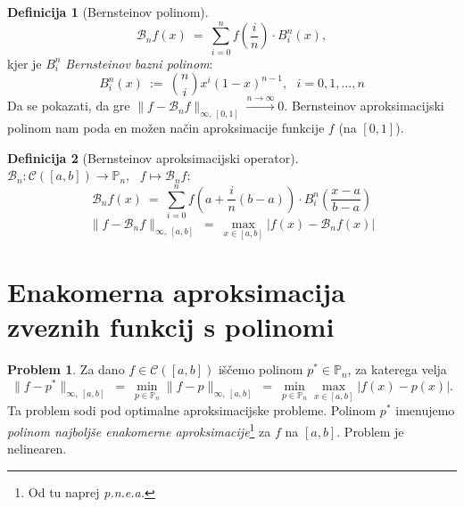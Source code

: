 \documentclass[11pt]{article}
\newcommand{\p}{\mathbb{P}}
\newcommand{\B}{\mathcal{B}}
\newcommand{\C}{\mathcal{C}}
\theoremstyle{definition}
\newtheorem{definicija}{Definicija}[section]
\theoremstyle{definition}
\newtheorem{problem}{Problem}[section]
\begin{document}
\begin{definicija}[Bernsteinov polinom]

$$\B_n f(x) ~=~ \sum_{i=0}^n f\left(\frac{i}{n}\right) \cdot B_i^n(x),$$
kjer je $B_i^n$ \textit{Bernsteinov bazni polinom}:
$$B_i^n(x) ~:=~ \binom{n}{i} x^i (1-x)^{n-1}, ~~~i = 0, 1, \ldots, n$$
Da se pokazati, da gre $\|f - \B_n f\|_{\infty,~[0, 1]} \xrightarrow{n \rightarrow \infty} 0$. Bernsteinov aproksimacijski polinom nam poda en možen način aproksimacije funkcije $f$ (na $[0,1]$).

\end{definicija}
\vspace{0.5cm}

\begin{definicija}[Bernsteinov aproksimacijski operator]
~\\
$\B_n: \C([a, b]) \rightarrow \p_n$, ~$f \mapsto \B_n f$:
$$\B_n f(x) ~=~ \sum_{i=0}^n f \left( a + \frac{i}{n} (b-a) \right) \cdot B_i^n\left(\frac{x-a}{b-a}\right)$$
$$\|f - \B_n f\|_{\infty, ~[a, b]} ~=~ \max_{x \in [a, b]} |f(x) - \B_n f(x)|$$ 

\end{definicija}
\vspace{0.5cm}

\pagebreak


\section{Enakomerna aproksimacija \\zveznih funkcij s polinomi}
\vspace{0.5cm}

\begin{problem}

Za dano $f \in \C([a, b])$ iščemo polinom $p^* \in \p_n$, za katerega velja
$$\|f - p^*\|_{\infty,~[a, b]} ~=~ \min_{p \in \p_n} \|f - p\|_{\infty,~[a, b]} ~=~ \min_{p \in \p_n} \max_{x \in [a, b]} |f(x) - p(x)|.$$
Ta problem sodi pod optimalne aproksimacijske probleme. Polinom $p^*$ imenujemo \textit{polinom najboljše enakomerne aproksimacije}\footnote{Od tu naprej \textit{p.n.e.a.}} za $f$ na $[a, b]$. Problem je nelinearen.

\end{problem}
\vspace{0.5cm}
\end{document}
